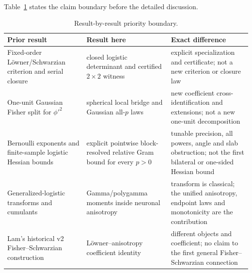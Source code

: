 \documentclass[11pt]{article}
\begin{document}
Table~\ref{tab:priority} states the claim boundary before the detailed discussion.
\begin{table}[H]
\centering
\small
\begin{tabular}{>{\raggedright\arraybackslash}p{}
                >{\raggedright\arraybackslash}p{}
                >{\raggedright\arraybackslash}p{}}
\toprule
Prior result & Result here & Exact difference \\
\midrule
Fixed-order L\"owner/Schwarzian criterion and serial closure
\cite{kozlovski2008,cook2023}
& closed logistic determinant and certified $2\times2$ witness
& explicit specialization and certificate; not a new criterion or closure law \\[3pt]
One-unit Gaussian Fisher split for $\phi'^2$ \cite{amari2019}
& spherical local bridge and Gaussian all-$p$ laws
& new coefficient cross-identification and extensions; not a new one-unit decomposition \\[3pt]
Bernoulli exponents and finite-sample logistic Hessian bounds
\cite{chen2026gd,ostrovskii2021,chardon2024,fisher2023}
& explicit pointwise block-resolved relative Gram bound for every $p>0$
& tunable precision, all powers, angle and slab obstruction; not the first bilateral or one-sided Hessian bound \\[3pt]
Generalized-logistic transforms and cumulants \cite{ojo2004,lee2025}
& Gamma/polygamma moments inside neuronal anisotropy
& transform is classical; the unified anisotropy, endpoint laws and monotonicity are the contribution \\[3pt]
Lam's historical v2 Fisher--Schwarzian construction \cite{lam2026v2}
& L\"owner--anisotropy coefficient identity
& different objects and coefficient; no claim to the first general Fisher--Schwarzian connection \\
\bottomrule
\end{tabular}
\caption{Result-by-result priority boundary.}
\label{tab:priority}
\end{table}
\end{document}
